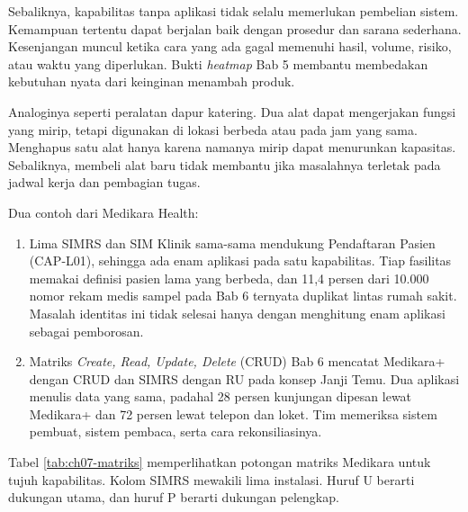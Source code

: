 Sebaliknya, kapabilitas tanpa aplikasi tidak selalu memerlukan pembelian sistem. Kemampuan
tertentu dapat berjalan baik dengan prosedur dan sarana sederhana. Kesenjangan muncul ketika cara
yang ada gagal memenuhi hasil, volume, risiko, atau waktu yang diperlukan. Bukti \textit{heatmap}
Bab 5 membantu membedakan kebutuhan nyata dari keinginan menambah produk.

Analoginya seperti peralatan dapur katering. Dua alat dapat mengerjakan fungsi yang mirip, tetapi
digunakan di lokasi berbeda atau pada jam yang sama. Menghapus satu alat hanya karena namanya mirip
dapat menurunkan kapasitas. Sebaliknya, membeli alat baru tidak membantu jika masalahnya terletak
pada jadwal kerja dan pembagian tugas.

Dua contoh dari Medikara Health:

\begin{enumerate}
  \item Lima SIMRS dan SIM Klinik sama-sama mendukung Pendaftaran Pasien (CAP-L01), sehingga ada
        enam aplikasi pada satu kapabilitas. Tiap fasilitas memakai definisi pasien lama yang
        berbeda, dan 11,4 persen dari 10.000 nomor rekam medis sampel pada Bab 6 ternyata duplikat
        lintas rumah sakit. Masalah identitas ini tidak selesai hanya dengan menghitung enam
        aplikasi sebagai pemborosan.
  \item Matriks \textit{Create, Read, Update, Delete} (CRUD) Bab 6 mencatat Medikara+ dengan CRUD
        dan SIMRS dengan RU pada konsep Janji Temu. Dua aplikasi menulis data yang sama, padahal
        28 persen kunjungan dipesan lewat Medikara+ dan 72 persen lewat telepon dan loket. Tim
        memeriksa sistem pembuat, sistem pembaca, serta cara rekonsiliasinya.
\end{enumerate}

Tabel \ref{tab:ch07-matriks} memperlihatkan potongan matriks Medikara untuk tujuh kapabilitas.
Kolom SIMRS mewakili lima instalasi. Huruf U berarti dukungan utama, dan huruf P berarti dukungan
pelengkap.

